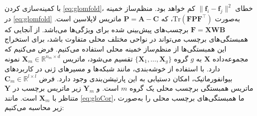 با کمینه‌سازی کردن \eqref{eq:glomfold}، خطای $\lVert\bm{f}_i-\bm{f}_j\rVert^2 $ کم خواهد بود. منظم‌ساز خمینه در \eqref{eq:glomfold} به‌صورت $\mathrm{Tr}(\bm{FPF}^\top)$، که $\bm{P} = \bm{A}-\bm{C}$ ماتریس لاپلاسین ‌است. $\bm{F}=\bm{XWB}$ برچسب‌های پیش‌بینی شده برای ویژگی‌ها می‌باشد. از آنجایی که همبستگی‌های برچسب می‌تواند در نواحی مختلف محلی متفاوت باشد، برای استخراج این همبستگی‌ها از منظم‌ساز خمینه محلی استفاده می‌کنیم. فرض می‌کنیم که مجموعه‌داده $\bm{X}$ به ${g}$ گروه $\{\bm{X}_1,{\dots},\bm{X}_g\}$ تقسیم می‌شود، ماتریس $\bm{X}_m \in \mathbb{R}^{n_m \times d}$ نمونه دارد. با استفاده از خوشه‌بندی، مانند شبکه‌ها و مسیرهای ژنی \cite{chuang2007network,subramanian2005gene} در کاربردهای بیوانفورماتیک، امکان دستیابی به این پارتیشن‌بندی وجود دارد. فرض  $\bm{C}_m \in \mathbb{R}^{{l} \times {l}}$ ماتریس همبستگی برچسب محلی یک گروه ${m}$ است. و $\bm{Y}_m$ زیر ماتریس برچسب در $\bm{Y}$ متناظر با $\bm{X}_m$ است. مانند \eqref{eq:gloCor}، ما همبستگی‌های برچسب محلی را به‌صورت زیر محاسبه می‌کنیم:

